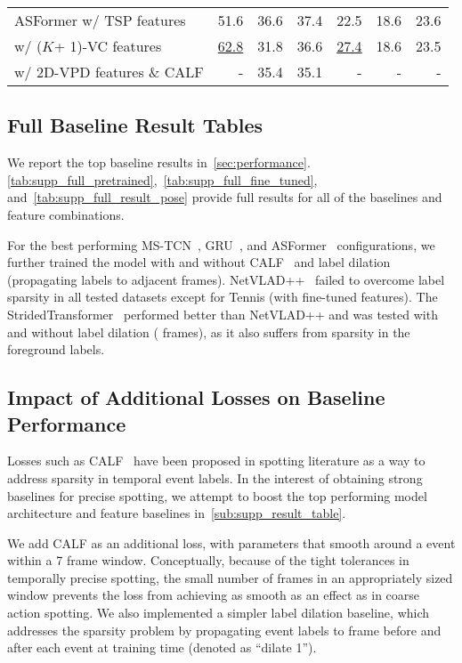\documentclass[runningheads]{llncs}
\newcommand{\notation}[1]{\ensuremath{#1}\xspace}
\newcommand{\NumClasses}{\notation{K}}
\newcommand{\best}[1]{\underline{#1}}
\begin{document}
\begin{table*}[p]
{\begin{tabularx}{\textwidth}{lrrrrrr}
        ASFormer w/ TSP features
            & 51.6
            & 36.6
            & 37.4
            & 22.5
            & 18.6 & 23.6 \\
        \hspace{4.4em} w/ (\NumClasses + 1)-VC features
            & \best{62.8}
            & 31.8
            & 36.6
            & \best{27.4}
            & 18.6 & 23.5 \\
        \hspace{4.4em} w/ 2D-VPD features \& CALF
            & - & 35.4 & 35.1 & - & - & - \\
        \bottomrule
    \end{tabularx}
    }
\end{table*} 
\subsection{Full Baseline Result Tables}
\label{sub:supp_result_table}

We report the top baseline results in~\autoref{sec:performance}.
\autoref{tab:supp_full_pretrained},~\ref{tab:supp_full_fine_tuned}, and~\ref{tab:supp_full_result_pose} provide full results for all of the baselines and feature combinations.

For the best performing MS-TCN~\cite{mstcn}, GRU~\cite{gatedrnn}, and ASFormer~\cite{asformer} configurations, we further trained the model with and without CALF~\cite{calf} and label dilation (propagating labels to  adjacent frames).
NetVLAD++~\cite{netvladpp} failed to overcome label sparsity in all tested datasets except for Tennis (with fine-tuned features).
The StridedTransformer~\cite{pytorchtransformer} performed better than NetVLAD++ and was tested with and without label dilation ( frames), as it also suffers from sparsity in the foreground labels.

\subsection{Impact of Additional Losses on Baseline Performance}
\label{sub:supp_calf_and_dilate}

Losses such as CALF~\cite{calf} have been proposed in spotting literature as a way to address sparsity in temporal event labels.
In the interest of obtaining strong baselines for precise spotting, we attempt to boost the top performing model architecture and feature baselines in~\autoref{sub:supp_result_table}.

We add CALF as an additional loss, with parameters that smooth around a event within a 7 frame window.
Conceptually, because of the tight tolerances in temporally precise spotting, the small number of frames in an appropriately sized window prevents the loss from achieving as smooth as an effect as in coarse action spotting.
We also implemented a simpler label dilation baseline, which addresses the sparsity problem by propagating event labels to  frame before and after each event at training time (denoted as ``dilate 1'').
\end{document}

